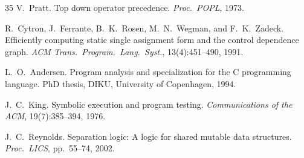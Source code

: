 \documentclass[10pt,a4paper]{article}
\begin{document}
\begin{thebibliography}{35}
V.~Pratt.
\newblock Top down operator precedence.
\newblock \emph{Proc.\ POPL}, 1973.

R.~Cytron, J.~Ferrante, B.~K.~Rosen, M.~N.~Wegman, and F.~K.~Zadeck.
\newblock Efficiently computing static single assignment form and the control dependence graph.
\newblock \emph{ACM Trans.\ Program.\ Lang.\ Syst.}, 13(4):451--490, 1991.

L.~O.~Andersen.
\newblock Program analysis and specialization for the {C} programming language.
\newblock PhD thesis, DIKU, University of Copenhagen, 1994.

J.~C.~King.
\newblock Symbolic execution and program testing.
\newblock \emph{Communications of the ACM}, 19(7):385--394, 1976.

J.~C.~Reynolds.
\newblock Separation logic: A logic for shared mutable data structures.
\newblock \emph{Proc.\ LICS}, pp.\ 55--74, 2002.

\end{thebibliography}


\end{document}
